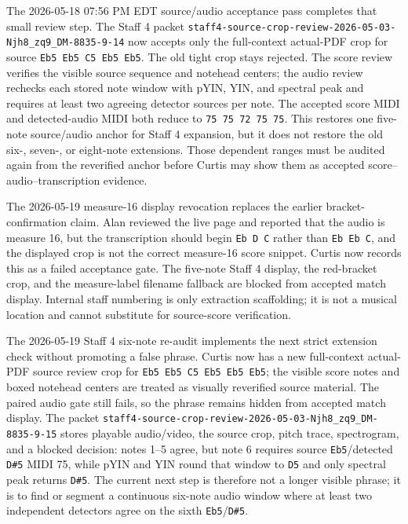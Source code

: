 The 2026-05-18 07:56 PM EDT source/audio acceptance pass completes that small review step. The Staff 4 packet \texttt{staff4-source-crop-review-2026-05-03-Njh8\_zq9\_DM-8835-9-14} now accepts only the full-context actual-PDF crop for source \texttt{Eb5 Eb5 C5 Eb5 Eb5}. The old tight crop stays rejected. The score review verifies the visible source sequence and notehead centers; the audio review rechecks each stored note window with pYIN, YIN, and spectral peak and requires at least two agreeing detector sources per note. The accepted score MIDI and detected-audio MIDI both reduce to \texttt{75 75 72 75 75}. This restores one five-note source/audio anchor for Staff 4 expansion, but it does not restore the old six-, seven-, or eight-note extensions. Those dependent ranges must be audited again from the reverified anchor before Curtis may show them as accepted score--audio--transcription evidence.

The 2026-05-19 measure-16 display revocation replaces the earlier bracket-confirmation claim. Alan reviewed the live page and reported that the audio is measure 16, but the transcription should begin \texttt{Eb D C} rather than \texttt{Eb Eb C}, and the displayed crop is not the correct measure-16 score snippet. Curtis now records this as a failed acceptance gate. The five-note Staff 4 display, the red-bracket crop, and the measure-label filename fallback are blocked from accepted match display. Internal staff numbering is only extraction scaffolding; it is not a musical location and cannot substitute for source-score verification.

The 2026-05-19 Staff 4 six-note re-audit implements the next strict extension check without promoting a false phrase. Curtis now has a new full-context actual-PDF source review crop for \texttt{Eb5 Eb5 C5 Eb5 Eb5 Eb5}; the visible score notes and boxed notehead centers are treated as visually reverified source material. The paired audio gate still fails, so the phrase remains hidden from accepted match display. The packet \texttt{staff4-source-crop-review-2026-05-03-Njh8\_zq9\_DM-8835-9-15} stores playable audio/video, the source crop, pitch trace, spectrogram, and a blocked decision: notes 1--5 agree, but note 6 requires source \texttt{Eb5}/detected \texttt{D\#5} MIDI 75, while pYIN and YIN round that window to \texttt{D5} and only spectral peak returns \texttt{D\#5}. The current next step is therefore not a longer visible phrase; it is to find or segment a continuous six-note audio window where at least two independent detectors agree on the sixth \texttt{Eb5}/\texttt{D\#5}.

